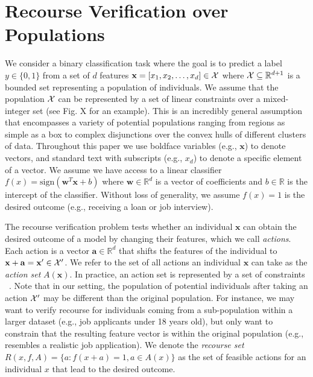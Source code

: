 \section{Recourse Verification over Populations}
We consider a binary classification task where the goal is to predict a label $y \in \{0,1\}$ from a set of $d$ features $\mathbf{x} = [x_1, x_2, \dots, x_d ] \in {\cal X}$ where ${\cal X} \subseteq \mathbb{R}^{d+1}$ is a bounded set representing a population of individuals. We assume that the population ${\cal X}$ can be represented by a set of linear constraints over a mixed-integer set (see Fig. X for an example). This is an incredibly general assumption that encompasses a variety of potential populations ranging from regions as simple as a box to complex disjunctions over the convex hulls of different clusters of data. Throughout this paper we use boldface variables (e.g., $\mathbf{x}$) to denote vectors, and standard text with subscripts (e.g., $x_d$) to denote a specific element of a vector. We assume we have access to a linear classifier $f(x) = \text{sign}(\mathbf{w}^T\mathbf{x} + b)$ where $\mathbf{w} \in \mathbb{R}^d$ is a vector of coefficients and $b \in \mathbb{R}$ is the intercept of the classifier. Without loss of generality, we assume $f(x) = 1$ is the desired outcome (e.g., receiving a loan or job interview).

The recourse verification problem \cite{kothari2023prediction} tests whether an individual $\mathbf{x}$ can obtain the desired outcome of a model by changing their features, which we call \textit{actions}. Each action is a vector $\mathbf{a} \in \mathbb{R}^{d}$ that shifts the features of the individual to $\mathbf{x} + \mathbf{a} = \mathbf{x}' \in {\cal X}'$. We refer to the set of all actions an individual $\mathbf{x}$ can take as the \emph{action set} $A(\mathbf{x})$. In practice, an action set is represented by a set of constraints ~\citep[see][for details]{kothari2023prediction}. Note that in our setting, the population of potential individuals after taking an action ${\cal X}'$ may be different than the original population. For instance, we may want to verify recourse for individuals coming from a sub-population within a larger dataset (e.g., job applicants under 18 years old), but only want to constrain that the resulting feature vector is within the original population (e.g., resembles a realistic job application). We denote the \emph{recourse set} $R(x,f, A) = \{a: f(x + a) = 1, a \in A(x)\}$ as the set of feasible actions for an individual $x$ that lead to the desired outcome.

